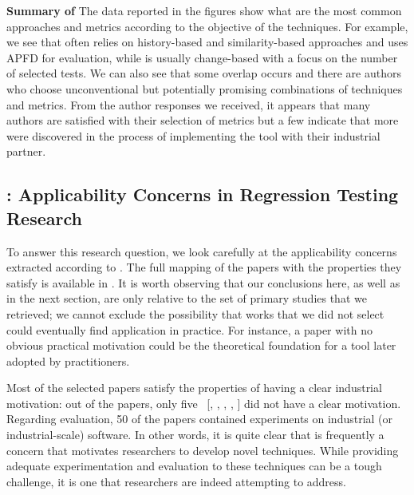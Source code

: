 \begin{tcolorbox}%
\textbf{Summary of } The data reported in the figures show what are the most common approaches and metrics according to the objective of the \rt techniques. For example, we see that \tcp often relies on history-based and similarity-based approaches and uses APFD for evaluation, while \tcs is usually change-based with a focus on the number of selected tests.
We can also see that some overlap occurs and there are authors who choose unconventional but potentially promising combinations of techniques and metrics.
From the author responses we received, it appears that many authors are satisfied with their selection of metrics but a few indicate that more were discovered in the process of implementing the tool with their industrial partner.
\end{tcolorbox}


\subsection{: Applicability Concerns in Regression Testing Research}
\label{sec:lit_rq2}



To answer this research question, we look carefully at the applicability concerns extracted according to .
The full mapping of the papers with the properties they satisfy is available in .
It is worth observing that our conclusions here, as well as in the next section, are only relative to the set of primary studies that we retrieved; we cannot exclude the possibility that works that we did not select could eventually find application in practice.
For instance, a paper with no obvious practical motivation could be the theoretical foundation for a tool later adopted by practitioners.

Most of the selected papers satisfy the properties of having a clear industrial motivation: out of the \numpapers papers, only five~
[, 
,
,  
, 
] did not have a clear \rea motivation.
Regarding evaluation, 50 of the papers contained experiments on industrial (or industrial-scale) software.
In other words, it is quite clear that \rea is frequently a concern that motivates researchers to develop novel \rt techniques.
While providing adequate experimentation and evaluation to these techniques can be a tough challenge, it is one that researchers are indeed attempting to address.

